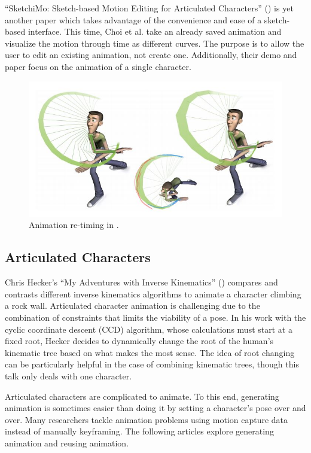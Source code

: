 ``SketchiMo: Sketch-based Motion Editing for Articulated Characters'' (\citep{choi2016sketchimo}) is yet another paper which takes advantage of the convenience and ease of a sketch-based interface. This time,  Choi et al. take an already saved animation and visualize the motion through time as different curves. The purpose is to allow the user to edit an existing animation, not create one. Additionally, their demo and paper focus on the animation of a single character.

\begin{figure}[!h]
\centering
\includegraphics[scale=0.5]{img/sketchimo}
\caption{Animation re-timing in \citep{choi2016sketchimo}.}
\end{figure}

\subsection{Articulated Characters}
Chris Hecker's ``My Adventures with Inverse Kinematics'' (\citep{hecker2002my}) compares and contrasts different inverse kinematics algorithms to animate a character climbing a rock wall. Articulated character animation is challenging due to the combination of constraints that limits the viability of a pose. In his work with the  cyclic coordinate descent (CCD) algorithm, whose calculations must start at a fixed root, Hecker decides to dynamically change the root of the human's kinematic tree based on what makes the most sense. The idea of root changing can be particularly helpful in the case of combining kinematic trees, though this talk only deals with one character.

Articulated characters are complicated to animate. To this end, generating animation is sometimes easier than doing it by setting a character's pose over and over. Many researchers tackle animation problems using motion capture data instead of manually keyframing. The following articles explore generating animation and reusing animation.

